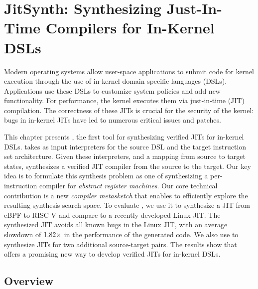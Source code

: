 \chapter{JitSynth: Synthesizing Just-In-Time Compilers for In-Kernel DSLs}
\label{c:jitsynth}
% 


Modern operating systems allow user-space applications to submit code for kernel
execution through the use of in-kernel domain specific languages (DSLs).
Applications use these DSLs to customize system policies and add new
functionality. For performance, the kernel executes them via just-in-time (JIT)
compilation. The correctness of these JITs is crucial for the security of the
kernel: bugs in in-kernel JITs have led to numerous critical issues and
patches.\tighten

\smallskip
This chapter presents \jitsynth, the first tool for synthesizing verified JITs for
in-kernel DSLs. \jitsynth takes as input interpreters for the source DSL and the
target instruction set architecture. Given these interpreters, and a mapping
from source to target states, \jitsynth synthesizes a verified JIT compiler from
the source to the target. Our key idea is to formulate this synthesis problem as
one of synthesizing a per-instruction compiler for \emph{abstract register
machines}. Our core technical contribution is a new \emph{compiler metasketch}
that enables \jitsynth to efficiently explore the resulting synthesis search
space. To evaluate \jitsynth, we use it to synthesize a JIT from eBPF to RISC-V
and compare to a recently developed Linux JIT\@. The synthesized JIT avoids all
known bugs in the Linux JIT, with an average slowdown of
$1.82\times$ in the performance of the generated code. We also
use \jitsynth to synthesize JITs for two additional source-target
pairs.  The results show that \jitsynth offers a promising new way
to develop verified JITs for in-kernel DSLs.\tighten


\section{Overview}
















%
%

% 

